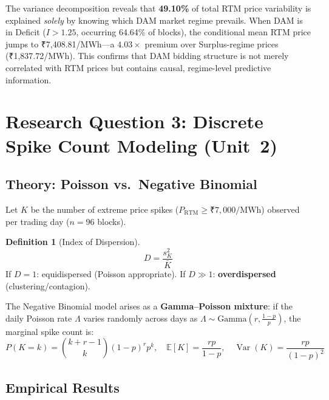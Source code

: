 \documentclass[12pt, a4paper]{article}
\theoremstyle{definition}
\newtheorem{definition}{Definition}[section]
\newcommand{\MWh}{\text{MWh}}
\newcommand{\rtm}{\text{RTM}}
\begin{document}
The variance decomposition reveals that \textbf{49.10\%} of total RTM price variability is explained \emph{solely} by knowing which DAM market regime prevails. When DAM is in Deficit ($I > 1.25$, occurring 64.64\% of blocks), the conditional mean RTM price jumps to ₹7,408.81/MWh---a $4.03\times$ premium over Surplus-regime prices (₹1,837.72/MWh). This confirms that DAM bidding structure is not merely correlated with RTM prices but contains causal, regime-level predictive information.

\section{Research Question 3: Discrete Spike Count Modeling (Unit~2)}

\subsection{Theory: Poisson vs.\ Negative Binomial}

Let $K$ be the number of extreme price spikes ($P_{\rtm} \geq \text{₹}7{,}000/\MWh$) observed per trading day ($n = 96$ blocks).

\begin{definition}[Index of Dispersion]
\begin{equation}
    D = \frac{s_K^2}{\bar{K}}
\end{equation}
If $D = 1$: equidispersed (Poisson appropriate). If $D \gg 1$: \textbf{overdispersed} (clustering/contagion).
\end{definition}

The Negative Binomial model arises as a \textbf{Gamma--Poisson mixture}: if the daily Poisson rate $\Lambda$ varies randomly across days as $\Lambda \sim \text{Gamma}(r, \frac{1-p}{p})$, the marginal spike count is:
\begin{equation}
    P(K = k) = \binom{k + r - 1}{k} (1-p)^r p^k, \quad \mathbb{E}[K] = \frac{rp}{1-p}, \quad \operatorname{Var}(K) = \frac{rp}{(1-p)^2}
\end{equation}

\subsection{Empirical Results}
\end{document}
